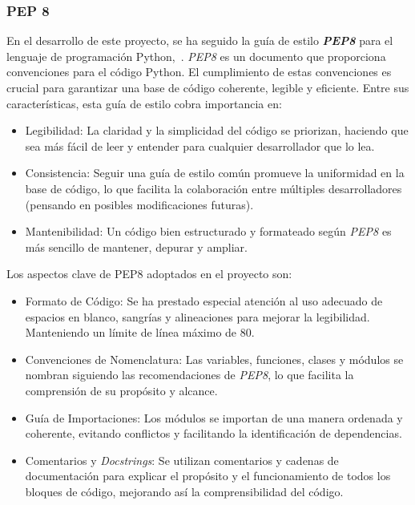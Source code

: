 \subsubsection{PEP 8}
En el desarrollo de este proyecto, se ha seguido la guía de estilo \textbf{\textit{PEP8}} para el lenguaje de programación Python,~\cite{Guia:PEP8}. \textit{PEP8} es un documento que proporciona convenciones para el código Python. El cumplimiento de estas convenciones es crucial para garantizar una base de código coherente, legible y eficiente.  
Entre sus características, esta guía de estilo cobra importancia en:
\begin{itemize}
	\item Legibilidad: La claridad y la simplicidad del código se priorizan, haciendo que sea más fácil de leer y entender para cualquier desarrollador que lo lea.
	\item Consistencia: Seguir una guía de estilo común promueve la uniformidad en la base de código, lo que facilita la colaboración entre múltiples desarrolladores (pensando en posibles modificaciones futuras).
	\item Mantenibilidad: Un código bien estructurado y formateado según \textit{PEP8} es más sencillo de mantener, depurar y ampliar.
\end{itemize}
Los aspectos clave de PEP8 adoptados en el proyecto son:
\begin{itemize}
	\item Formato de Código: Se ha prestado especial atención al uso adecuado de espacios en blanco, sangrías y alineaciones para mejorar la legibilidad. Manteniendo un límite de línea máximo de 80.
	\item Convenciones de Nomenclatura: Las variables, funciones, clases y módulos se nombran siguiendo las recomendaciones de \textit{PEP8}, lo que facilita la comprensión de su propósito y alcance.
	\item Guía de Importaciones: Los módulos se importan de una manera ordenada y coherente, evitando conflictos y facilitando la identificación de dependencias.
	\item Comentarios y \textit{Docstrings}: Se utilizan comentarios y cadenas de documentación para explicar el propósito y el funcionamiento de todos los bloques de código, mejorando así la comprensibilidad del código.
\end{itemize}
